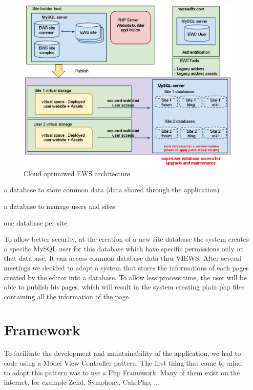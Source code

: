 \begin{figure}[h!]
\centering
\includegraphics[width=.55\textwidth]{img/ews_archi_after.png}
\caption{Cloud optimiwed EWS architecture }
\label{figure:ews_archi_after}
\end{figure}

\begin{itemize*}
\item a database to store common data (data shared through the application)
\item a database to manage users and sites
\item one database per site 
\end{itemize*}

To allow better security, at the creation of a new site database the system creates a specific MySQL user for this database which have specific permissions only on that database. It can access common database data thru VIEWS.
After several meetings we decided to adopt a system that stores the informations of each pages created by the editor into a database. To allow less process time, the user will be able to publish his pages, which will result in the system creating plain php files containing all the information of the page.

\section{Framework}

To facilitate the development and maintainability of the application, we had to code using a Model View Controller pattern. The first thing that came to mind to adopt this pattern was to use a Php Framework. Many of them exist on the internet, for example Zend, Symphony, CakePhp, ... 

